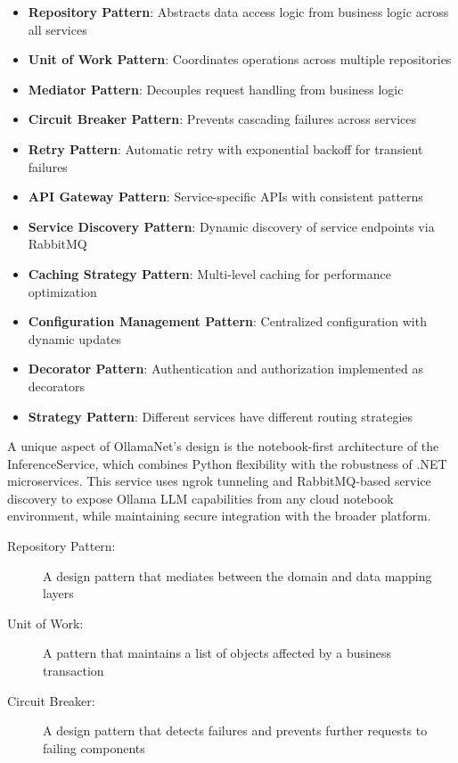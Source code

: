 \begin{itemize}
    \item \textbf{Repository Pattern}: Abstracts data access logic from business logic across all services
    \item \textbf{Unit of Work Pattern}: Coordinates operations across multiple repositories
    \item \textbf{Mediator Pattern}: Decouples request handling from business logic
    \item \textbf{Circuit Breaker Pattern}: Prevents cascading failures across services
    \item \textbf{Retry Pattern}: Automatic retry with exponential backoff for transient failures
    \item \textbf{API Gateway Pattern}: Service-specific APIs with consistent patterns
    \item \textbf{Service Discovery Pattern}: Dynamic discovery of service endpoints via RabbitMQ
    \item \textbf{Caching Strategy Pattern}: Multi-level caching for performance optimization
    \item \textbf{Configuration Management Pattern}: Centralized configuration with dynamic updates
    \item \textbf{Decorator Pattern}: Authentication and authorization implemented as decorators
    \item \textbf{Strategy Pattern}: Different services have different routing strategies
\end{itemize}


A unique aspect of OllamaNet's design is the notebook-first architecture of the InferenceService, which combines Python flexibility with the robustness of .NET microservices. This service uses ngrok tunneling and RabbitMQ-based service discovery to expose Ollama LLM capabilities from any cloud notebook environment, while maintaining secure integration with the broader platform.

\begin{terminology}
\begin{description}
    \item[Repository Pattern:] A design pattern that mediates between the domain and data mapping layers
    \item[Unit of Work:] A pattern that maintains a list of objects affected by a business transaction
    \item[Circuit Breaker:] A design pattern that detects failures and prevents further requests to failing components
\end{description}
\end{terminology}






